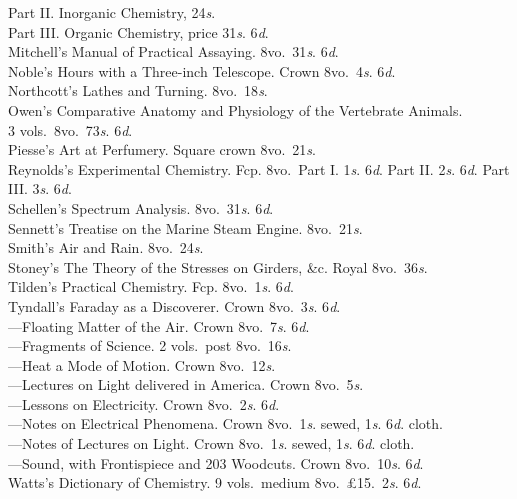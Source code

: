 \documentclass[letterpaper,12pt,oneside,openany]{memoir}
\newcommand{\D}{\hspace*{5mm}}
\newcommand{\E}{\hspace*{2mm}---\hspace*{2mm}}
\begin{document}
\begin{footnotesize}
\D Part II\@. Inorganic Chemistry, 24\textit{s}.\\
\D Part III\@. Organic Chemistry, price 31\textit{s}. 6\textit{d}.\\
Mitchell's Manual of Practical Assaying. 8vo.\ 31\textit{s}. 6\textit{d}.\\
Noble's Hours with a Three-inch Telescope. Crown 8vo.\ 4\textit{s}. 6\textit{d}.\\
Northcott's Lathes and Turning. 8vo.\ 18\textit{s}.\\
Owen's Comparative Anatomy and Physiology of the Vertebrate Animals.\\
\D 3 vols.\ 8vo.\ 73\textit{s}. 6\textit{d}.\\
Piesse's Art at Perfumery. Square crown 8vo.\ 21\textit{s}.\\
Reynolds's Experimental Chemistry. Fcp. 8vo.\ Part I. 1\textit{s}. 6\textit{d}. Part II. 2\textit{s}. 6\textit{d}. Part III. 3\textit{s}. 6\textit{d}.\\
Schellen's Spectrum Analysis. 8vo.\ 31\textit{s}. 6\textit{d}.\\
Sennett's Treatise on the Marine Steam Engine. 8vo.\ 21\textit{s}.\\
Smith's Air and Rain. 8vo.\ 24\textit{s}.\\
Stoney's The Theory of the Stresses on Girders, \&c. Royal 8vo.\ 36\textit{s}.\\
Tilden's Practical Chemistry. Fcp. 8vo.\ 1\textit{s}. 6\textit{d}.\\
Tyndall's Faraday as a Discoverer. Crown 8vo.\ 3\textit{s}. 6\textit{d}.\\
\E Floating Matter of the Air. Crown 8vo.\ 7\textit{s}. 6\textit{d}.\\
\E Fragments of Science. 2 vols.\ post 8vo.\ 16\textit{s}.\\
\E Heat a Mode of Motion. Crown 8vo.\ 12\textit{s}.\\
\E Lectures on Light delivered in America. Crown 8vo.\ 5\textit{s}.\\
\E Lessons on Electricity. Crown 8vo.\ 2\textit{s}. 6\textit{d}.\\
\E Notes on Electrical Phenomena. Crown 8vo.\ 1\textit{s}. sewed, 1\textit{s}. 6\textit{d}. cloth.\\
\E Notes of Lectures on Light. Crown 8vo.\ 1\textit{s}. sewed, 1\textit{s}. 6\textit{d}. cloth.\\
\E Sound, with Frontispiece and 203 Woodcuts. Crown 8vo.\ 10\textit{s}. 6\textit{d}.\\
Watts's Dictionary of Chemistry. 9 vols.\ medium 8vo.\ \pounds15.\ 2\textit{s}. 6\textit{d}.\\

\end{footnotesize}
\end{document}
